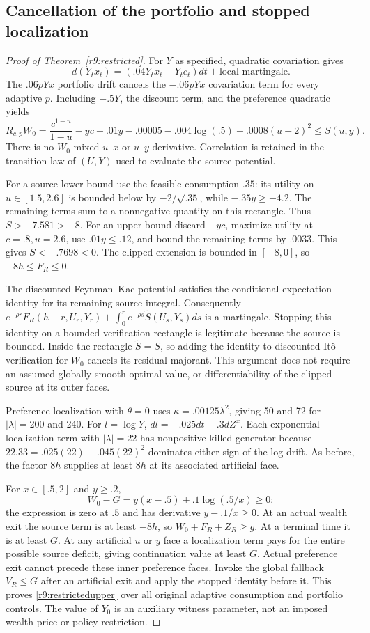 \subsection{Cancellation of the portfolio and stopped localization}
\begin{proof}[Proof of Theorem~\ref{r9:restricted}]
For $Y$ as specified, quadratic covariation gives
\[
 d(Y_tx_t)=(.04Y_tx_t-Y_tc_t)dt+\text{local martingale}.
\]
The $.06pYx$ portfolio drift cancels the $-.06pYx$ covariation term for every adaptive $p$. Including $-.5Y$, the discount term, and the preference quadratic yields
\[
 R_{c,p}W_0=\frac{c^{1-u}}{1-u}-yc+.01y-.00005-.004\log(.5)+.0008(u-2)^2\leq S(u,y).
\]
There is no $W_0$ mixed $u$--$x$ or $u$--$y$ derivative. Correlation is retained in the transition law of $(U,Y)$ used to evaluate the source potential.

For a source lower bound use the feasible consumption $.35$: its utility on $u\in[1.5,2.6]$ is bounded below by $-2/\sqrt{.35}$, while $-.35y\geq-4.2$. The remaining terms sum to a nonnegative quantity on this rectangle. Thus $S>-7.581>-8$. For an upper bound discard $-yc$, maximize utility at $c=.8,u=2.6$, use $.01y\leq.12$, and bound the remaining terms by $.0033$. This gives $S<-.7698<0$. The clipped extension is bounded in $[-8,0]$, so $-8h\leq F_R\leq0$.

The discounted Feynman--Kac potential satisfies the conditional expectation identity for its remaining source integral. Consequently $e^{-\rho r}F_R(h-r,U_r,Y_r)+\int_0^r e^{-\rho s}\widetilde S(U_s,Y_s)ds$ is a martingale. Stopping this identity on a bounded verification rectangle is legitimate because the source is bounded. Inside the rectangle $\widetilde S=S$, so adding the identity to discounted It\^o verification for $W_0$ cancels its residual majorant. This argument does not require an assumed globally smooth optimal value, or differentiability of the clipped source at its outer faces.

Preference localization with $\theta=0$ uses $\kappa=.00125\lambda^2$, giving 50 and 72 for $|\lambda|=200$ and 240. For $l=\log Y$, $dl=-.025dt-.3dZ^x$. Each exponential localization term with $|\lambda|=22$ has nonpositive killed generator because $22.33=.025(22)+.045(22)^2$ dominates either sign of the log drift. As before, the factor $8h$ supplies at least $8h$ at its associated artificial face.

For $x\in[.5,2]$ and $y\geq.2$,
\[
 W_0-G=y(x-.5)+.1\log(.5/x)\geq0:
\]
the expression is zero at $.5$ and has derivative $y-.1/x\geq0$. At an actual wealth exit the source term is at least $-8h$, so $W_0+F_R+Z_R\geq g$. At a terminal time it is at least $G$. At any artificial $u$ or $y$ face a localization term pays for the entire possible source deficit, giving continuation value at least $G$. Actual preference exit cannot precede these inner preference faces. Invoke the global fallback $V_R\leq G$ after an artificial exit and apply the stopped identity before it. This proves \eqref{r9:restrictedupper} over all original adaptive consumption and portfolio controls. The value of $Y_0$ is an auxiliary witness parameter, not an imposed wealth price or policy restriction.
\end{proof}

